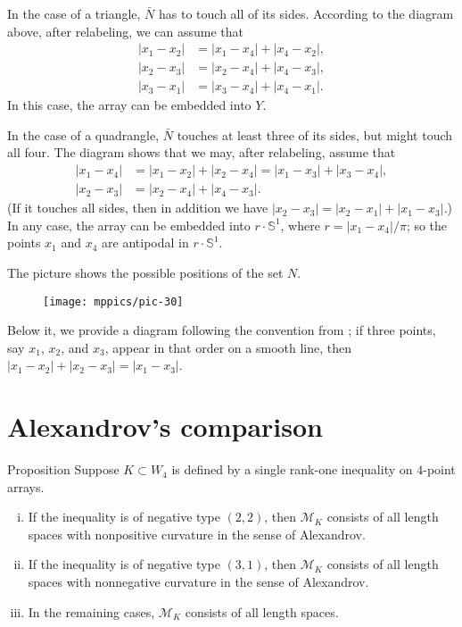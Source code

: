 \documentclass[a4paper,10pt]{article}
\begin{document}
In the case of a triangle, $\bar N$ has to touch all of its sides.
According to the diagram above, after relabeling, we can assume that
\begin{align*}
|x_1-x_2|&=|x_1-x_4|+|x_4-x_2|,
\\
|x_2-x_3|&=|x_2-x_4|+|x_4-x_3|,
\\
|x_3-x_1|&=|x_3-x_4|+|x_4-x_1|.
\end{align*}
In this case, the array can be embedded into $Y$.

In the case of a quadrangle, $\bar N$ touches at least three of its sides, but might touch all four.
The diagram shows that we may, after relabeling, assume that
\begin{align*}
|x_1-x_4|&=|x_1-x_2|+|x_2-x_4|=|x_1-x_3|+|x_3-x_4|,
\\
|x_2-x_3|&=|x_2-x_4|+|x_4-x_3|.
\end{align*}
(If it touches all sides, then in addition we have $|x_2-x_3|=|x_2-x_1|+|x_1-x_3|$.)
In any case, the array can be embedded into $r\cdot \mathbb{S}^1$, where $r=|x_1-x_4|/\pi$;
so the points $x_1$ and $x_4$ are antipodal in $r\cdot \mathbb{S}^1$.
\qeds

The picture shows the possible positions of the set $N$.
\begin{figure}[h!]
\centering
\vskip-0mm
\texttt{[image: mppics/pic-30]}
\vskip-0mm
\end{figure}
Below it, we provide a diagram following the convention from \cite{lebedeva-petrunin-2010};
if three points, say $x_1$, $x_2$, and $x_3$, appear in that order on a smooth line, then $|x_1-x_2|+|x_2-x_3|=|x_1-x_3|$.

\section{Alexandrov's comparison}\label{Alexandrov's comparison}

\begin{thm}{Proposition}\label{prop:Alexandrov's comparison}
Suppose $K\subset W_4$ is defined by a single rank-one inequality on $4$-point arrays.
\begin{enumerate}[(i)]
\item If the inequality is of negative type $(2,2)$, then $\mathcal{M}_K$ consists of all length spaces with nonpositive curvature in the sense of Alexandrov.
\item \label{prop:Alexandrov's comparison:(3,1)} If the inequality is of negative type $(3,1)$, then $\mathcal{M}_K$ consists of all length spaces with nonnegative curvature in the sense of Alexandrov.
\item In the remaining cases, $\mathcal{M}_K$ consists of all length spaces.
\end{enumerate}

\end{thm}
\end{document}

